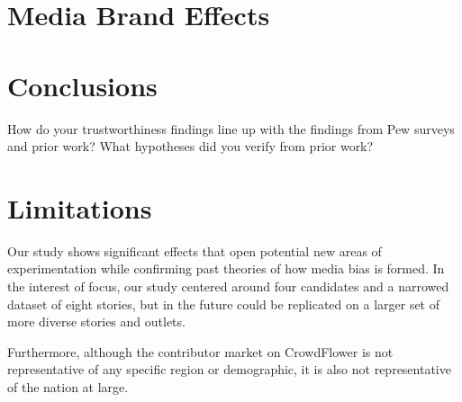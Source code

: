 \section{Media Brand Effects}



\section{Conclusions}

How do your trustworthiness findings line up with the findings from Pew surveys and prior work? What hypotheses did you verify from prior work?

\section{Limitations}

Our study shows significant effects that open potential new areas of experimentation while confirming past theories of how media bias is formed. In the interest of focus, our study centered around four candidates and a narrowed dataset of eight stories, but in the future could be replicated on a larger set of more diverse stories and outlets. 

Furthermore, although the contributor market on CrowdFlower is not representative of any specific region or demographic, it is also not representative of the nation at large.
